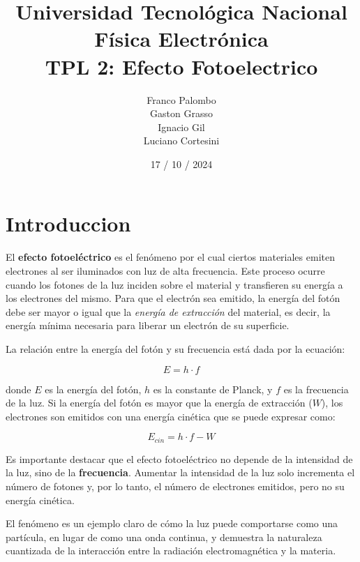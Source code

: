 \documentclass[a4paper,12pt]{report}
\title{%
  \fontsize{25}{0}\selectfont Universidad Tecnológica Nacional \\
  \fontsize{22}{30}\selectfont Física Electrónica \\
  \fontsize{18}{25}\selectfont TPL 2: Efecto Fotoelectrico
}
\author{
Franco Palombo\\
Gaston Grasso\\
Ignacio Gil\\
Luciano Cortesini\\
}
\date{17 / 10 / 2024}
\begin{document}
\maketitle

\chapter{Introduccion}
  El \textbf{efecto fotoeléctrico} es el fenómeno por el cual ciertos materiales emiten electrones al ser iluminados
  con luz de alta frecuencia. Este proceso ocurre cuando los fotones de la luz inciden sobre el material y transfieren
  su energía a los electrones del mismo. Para que el electrón sea emitido, la energía del fotón debe ser mayor o igual
  que la \textit{energía de extracción} del material, es decir, la energía mínima necesaria para liberar un electrón de
  su superficie.


  La relación entre la energía del fotón y su frecuencia está dada por la ecuación:

  \[
    E = h \cdot f
  \]

  donde \(E\) es la energía del fotón, \(h\) es la constante de Planck, y \(f\) es la frecuencia de la luz. Si la
  energía del fotón es mayor que la energía de extracción (\(W\)), los electrones son emitidos con una energía cinética
  que se puede expresar como:

  \[
    E_{cin} = h \cdot f - W
  \]

  Es importante destacar que el efecto fotoeléctrico no depende de la intensidad de la luz, sino de la
  \textbf{frecuencia}. Aumentar la intensidad de la luz solo incrementa el número de fotones y, por lo tanto, el número
  de electrones emitidos, pero no su energía cinética.

  El fenómeno es un ejemplo claro de cómo la luz puede comportarse como una partícula, en lugar de como una onda
  continua, y demuestra la naturaleza cuantizada de la interacción entre la radiación electromagnética y la materia.
\end{document}
